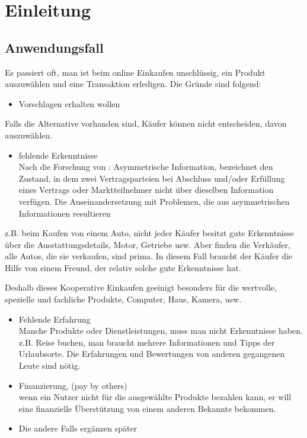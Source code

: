 
\chapter{Einleitung}


\section{Anwendungsfall}

Es passiert oft, man ist beim online Einkaufen unschlüssig, ein Produkt auszuwählen und eine Transaktion erledigen. Die Gründe sind folgend:

\begin{itemize}
\item Vorschlagen erhalten wollen
\end{itemize}

Falls die Alternative vorhanden sind, Käufer können nicht entscheiden, davon auszuwählen.

\begin{itemize}
\item fehlende Erkenntnisse\\
Nach die Forschung von \textcite{akerlof:lemons}: \glqq Asymmetrische Information, bezeichnet den Zustand, in dem zwei Vertragsparteien bei Abschluss und/oder Erfüllung eines Vertrags oder Marktteilnehmer nicht über dieselben Information verfügen. Die Auseinandersetzung mit Problemen, die aus asymmetrischen Informationen resultieren\grqq
\end{itemize}

z.B. beim Kaufen von einem Auto, nicht jeder Käufer besitzt gute Erkenntnisse über die Ausstattungsdetails, Motor, Getriebe usw. Aber finden die Verkäufer, alle Autos, die sie verkaufen, sind prima. In diesem Fall braucht der Käufer die Hilfe von einem Freund, der relativ solche gute Erkenntnisse hat.

Deshalb dieses Kooperative Einkaufen geeinigt besonders für die wertvolle, spezielle und fachliche Produkte, Computer, Haus, Kamera, usw.

\begin{itemize}
\item Fehlende Erfahrung\\
Manche Produkte oder Dienstleistungen, muss man nicht Erkenntnisse haben. z.B. Reise buchen, man braucht mehrere Informationen und Tipps der Urlaubsorte. Die Erfahrungen und Bewertungen von anderen gegangenen Leute sind nötig.
\item Finanzierung, (pay by others)\\
wenn ein Nutzer nicht für die ausgewählte Produkte bezahlen kann, er will eine finanzielle Überstützung von einem anderen Bekannte bekommen.
\item Die andere Falls ergänzen später
\end{itemize}


